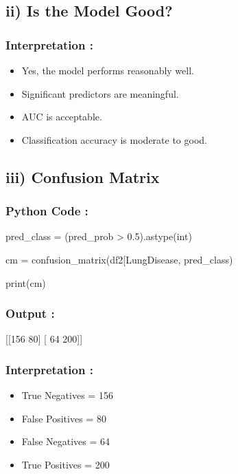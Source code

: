 \documentclass[
]{article}
\begin{document}
\subsection{\texorpdfstring{\textbf{ii) Is the Model
Good?}}{ii) Is the Model Good?}}\label{ii-is-the-model-good}

\subsubsection{Interpretation :}\label{interpretation-7}

\begin{itemize}
\item
  Yes, the model performs reasonably well.
\item
  Significant predictors are meaningful.
\item
  AUC is acceptable.
\item
  Classification accuracy is moderate to good.
\end{itemize}

\subsection{\texorpdfstring{\textbf{iii) Confusion
Matrix}}{iii) Confusion Matrix}}\label{iii-confusion-matrix}

\subsubsection{\texorpdfstring{Python Code :
}{Python Code : }}\label{python-code-5}

pred\_class = (pred\_prob \textgreater{} 0.5).astype(int)

cm =
confusion\_matrix(df2{[}\textquotesingle LungDisease\textquotesingle{]},
pred\_class)

print(cm)

\subsubsection{Output :}\label{output-2}

{[}{[}156 80{]} {[} 64 200{]}{]}

\subsubsection{Interpretation :}\label{interpretation-8}

\begin{itemize}
\item
  True Negatives = 156
\item
  False Positives = 80
\item
  False Negatives = 64
\item
  True Positives = 200
\end{itemize}
\end{document}

